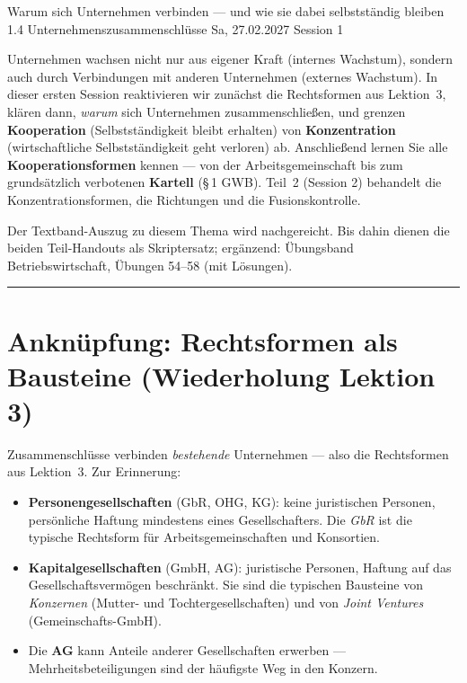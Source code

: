 \documentclass[11pt, a4paper]{article}
\begin{document}
%
  {Warum sich Unternehmen verbinden --- und wie sie dabei selbstständig bleiben}%
  {1.4 Unternehmenszusammenschlüsse}%
  {Sa, 27.02.2027 \textperiodcentered{} Session 1}

\begin{merksatz}[title={\bfseries Worum geht es in Teil 1?}]
Unternehmen wachsen nicht nur aus eigener Kraft (internes Wachstum), sondern auch durch
Verbindungen mit anderen Unternehmen (externes Wachstum). In dieser ersten Session
reaktivieren wir zunächst die Rechtsformen aus Lektion~3, klären dann, \emph{warum} sich
Unternehmen zusammenschließen, und grenzen \textbf{Kooperation} (Selbstständigkeit bleibt
erhalten) von \textbf{Konzentration} (wirtschaftliche Selbstständigkeit geht verloren)
ab. Anschließend lernen Sie alle \textbf{Kooperationsformen} kennen --- von der
Arbeitsgemeinschaft bis zum grundsätzlich verbotenen \textbf{Kartell} (\S\,1 GWB).
Teil~2 (Session 2) behandelt die Konzentrationsformen, die Richtungen und die
Fusionskontrolle.
\end{merksatz}

\begin{beispiel}[title={Hinweis zur Literatur}]
Der Textband-Auszug zu diesem Thema wird nachgereicht. Bis dahin dienen die beiden
Teil-Handouts als Skriptersatz; ergänzend: Übungsband Betriebswirtschaft,
Übungen 54--58 (mit Lösungen).
\end{beispiel}

\tableofcontents
\vspace{1em}
\hrule
\vspace{1em}

\section{Anknüpfung: Rechtsformen als Bausteine (Wiederholung Lektion 3)}

Zusammenschlüsse verbinden \emph{bestehende} Unternehmen --- also die Rechtsformen aus
Lektion~3. Zur Erinnerung:

\begin{itemize}
  \item \textbf{Personengesellschaften} (GbR, OHG, KG): keine juristischen Personen,
    persönliche Haftung mindestens eines Gesellschafters. Die \emph{GbR} ist die typische
    Rechtsform für Arbeitsgemeinschaften und Konsortien.
  \item \textbf{Kapitalgesellschaften} (GmbH, AG): juristische Personen, Haftung auf das
    Gesellschaftsvermögen beschränkt. Sie sind die typischen Bausteine von
    \emph{Konzernen} (Mutter- und Tochtergesellschaften) und von \emph{Joint Ventures}
    (Gemeinschafts-GmbH).
  \item Die \textbf{AG} kann Anteile anderer Gesellschaften erwerben ---
    Mehrheitsbeteiligungen sind der häufigste Weg in den Konzern.
\end{itemize}
\end{document}
